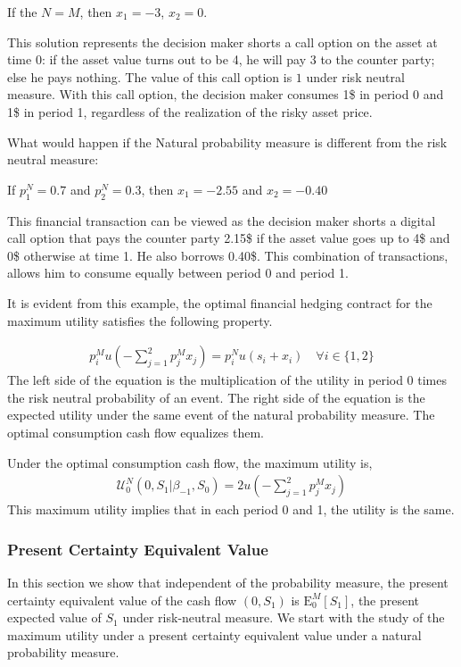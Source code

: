 \documentclass{article}[12pt letter]
\newcommand{\E}{\mathrm{E}}
\begin{document}
{\proposition If the $N=M$, then $x_1 = -3$, $x_2 = 0$. }

This solution represents the decision maker shorts a call option on the asset at time 0: if the asset value turns out to be 4, he will pay 3 to the counter party; else he pays nothing. The value of this call option is $1$ under risk neutral measure. With this call option, the decision maker consumes 1\$ in period 0 and 1\$ in period 1, regardless of the realization of the risky asset price. 


What would happen if the Natural probability measure is different from the risk neutral measure:

{\proposition If $p^N_1 = 0.7$ and $p_2^N =0.3$, then $x_1 = -2.55$ and $x_2 = -0.40$ }

This financial transaction can be viewed as the decision maker shorts a digital call option that pays the counter party 2.15\$ if the asset value goes up to 4\$ and 0\$ otherwise at time 1. He also borrows 0.40\$. This combination of transactions, allows him to consume equally between period 0 and period 1.

It is evident from this example, the optimal financial hedging contract for the maximum utility satisfies the following property. 

\begin{align} \label{eqn:fonc-cash}
p_i^Mu(-\sum_{j=1}^2 p_j^M x_j) = p_i^N u(s_i + x_i)\quad  \forall i \in \{1,2\}
\end{align}
The left side of the equation is the multiplication of the utility in period 0 times the risk neutral probability of an event. The right side of the equation is the expected utility under the same event of the natural probability measure. The optimal consumption cash flow equalizes them.  

Under the optimal consumption cash flow, the maximum utility is,
\begin{align} \label{eqn:maxU-cash}
\mathcal{U}^N_0 (0, S_1|\beta_{-1},S_0)  = 2u(-\sum_{j=1}^2 p_j^M x_j) 
\end{align}
This maximum utility implies that in each period 0 and 1, the utility is the same. 

\subsubsection{ Present Certainty Equivalent Value}
In this section we show that independent of the probability measure, the present certainty equivalent value of the cash flow $(0, S_1)$ is  $\E_0^M [S_1]$, the present expected value of $S_1$ under risk-neutral measure. We start with the study of the maximum utility under a present certainty equivalent value under a natural probability measure.
\end{document}
